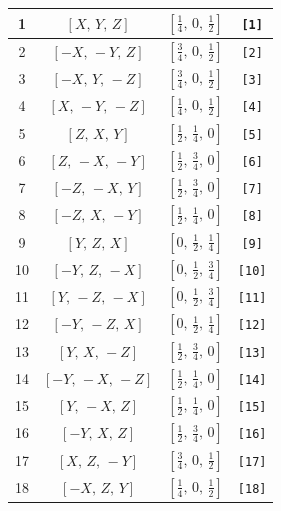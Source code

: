 \documentclass[fleqn,8pt]{jsarticle}
\begin{document}
\begin{longtable}{cccc}
1 & $\left[ X,\, Y,\, Z \right]$ & $\left[ \frac{1}{4},\, 0,\, \frac{1}{2} \right]$ & {\tt [1]} \\ \hline
2 & $\left[ - X,\, - Y,\, Z \right]$ & $\left[ \frac{3}{4},\, 0,\, \frac{1}{2} \right]$ & {\tt [2]} \\ \hline
3 & $\left[ - X,\, Y,\, - Z \right]$ & $\left[ \frac{3}{4},\, 0,\, \frac{1}{2} \right]$ & {\tt [3]} \\ \hline
4 & $\left[ X,\, - Y,\, - Z \right]$ & $\left[ \frac{1}{4},\, 0,\, \frac{1}{2} \right]$ & {\tt [4]} \\ \hline
5 & $\left[ Z,\, X,\, Y \right]$ & $\left[ \frac{1}{2},\, \frac{1}{4},\, 0 \right]$ & {\tt [5]} \\ \hline
6 & $\left[ Z,\, - X,\, - Y \right]$ & $\left[ \frac{1}{2},\, \frac{3}{4},\, 0 \right]$ & {\tt [6]} \\ \hline
7 & $\left[ - Z,\, - X,\, Y \right]$ & $\left[ \frac{1}{2},\, \frac{3}{4},\, 0 \right]$ & {\tt [7]} \\ \hline
8 & $\left[ - Z,\, X,\, - Y \right]$ & $\left[ \frac{1}{2},\, \frac{1}{4},\, 0 \right]$ & {\tt [8]} \\ \hline
9 & $\left[ Y,\, Z,\, X \right]$ & $\left[ 0,\, \frac{1}{2},\, \frac{1}{4} \right]$ & {\tt [9]} \\ \hline
10 & $\left[ - Y,\, Z,\, - X \right]$ & $\left[ 0,\, \frac{1}{2},\, \frac{3}{4} \right]$ & {\tt [10]} \\ \hline
11 & $\left[ Y,\, - Z,\, - X \right]$ & $\left[ 0,\, \frac{1}{2},\, \frac{3}{4} \right]$ & {\tt [11]} \\ \hline
12 & $\left[ - Y,\, - Z,\, X \right]$ & $\left[ 0,\, \frac{1}{2},\, \frac{1}{4} \right]$ & {\tt [12]} \\ \hline
13 & $\left[ Y,\, X,\, - Z \right]$ & $\left[ \frac{1}{2},\, \frac{3}{4},\, 0 \right]$ & {\tt [13]} \\ \hline
14 & $\left[ - Y,\, - X,\, - Z \right]$ & $\left[ \frac{1}{2},\, \frac{1}{4},\, 0 \right]$ & {\tt [14]} \\ \hline
15 & $\left[ Y,\, - X,\, Z \right]$ & $\left[ \frac{1}{2},\, \frac{1}{4},\, 0 \right]$ & {\tt [15]} \\ \hline
16 & $\left[ - Y,\, X,\, Z \right]$ & $\left[ \frac{1}{2},\, \frac{3}{4},\, 0 \right]$ & {\tt [16]} \\ \hline
17 & $\left[ X,\, Z,\, - Y \right]$ & $\left[ \frac{3}{4},\, 0,\, \frac{1}{2} \right]$ & {\tt [17]} \\ \hline
18 & $\left[ - X,\, Z,\, Y \right]$ & $\left[ \frac{1}{4},\, 0,\, \frac{1}{2} \right]$ & {\tt [18]} \\ \hline

\end{longtable}
\end{document}
